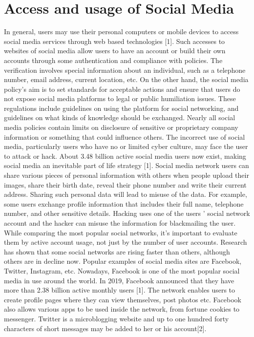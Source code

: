 \section{Access and usage of Social Media}
\hspace{0.3in}In general, users may use their personal computers or
mobile devices to access social media services through web
based technologies [1]. Such accesses to websites of social
media allow users to have an account or build their own
accounts through some authentication and compliance with
policies. The verification involves special information about
an individual, such as a telephone number, email address,
current location, etc. On the other hand, the social media
policy's aim is to set standards for acceptable actions and
ensure that users do not expose social media platforms to legal
or public humiliation issues.
These regulations include guidelines on using the platform
for social networking, and guidelines on what kinds of
knowledge should be exchanged. Nearly all social media
policies contain limits on disclosure of sensitive or proprietary
company information or something that could influence
others. The incorrect use of social media, particularly users
who have no or limited cyber culture, may face the user to
attack or hack.
About 3.48 billion active social media users now exist,
making social media an inevitable part of life strategy [1].
Social media network users can share various pieces of
personal information with others when people upload their
images, share their birth date, reveal their phone number and
write their current address. Sharing such personal data will
lead to misuse of the data. For example, some users exchange
profile information that includes their full name, telephone
number, and other sensitive details. Hacking uses one of the
users ' social network account and the hacker can misuse the
information for blackmailing the user.
While comparing the most popular social networks, it's
important to evaluate them by active account usage, not just
by the number of user accounts. Research has shown that
some social networks are rising faster than others, although
others are in decline now. Popular examples of social media
sites are Facebook, Twitter, Instagram, etc.
Nowadays, Facebook is one of the most popular social
media in use around the world. In 2019, Facebook announced
that they have more than 2.38 billion active monthly users [1].
The network enables users to create profile pages where they
can view themselves, post photos etc. Facebook also allows
various apps to be used inside the network, from fortune
cookies to messenger. Twitter is a microblogging website and
up to one hundred forty characters of short messages may be
added to her or his account[2].
\\
